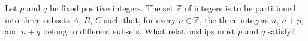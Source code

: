 Let $p$ and $q$ be fixed positive integers. The set $\mathbb{Z}$ of integers is to be partitioned into three subsets $A$, $B$, $C$ such that, for every $n \in \mathbb{Z}$, the three integers $n$, $n + p$, and $n + q$ belong to different subsets. What relationships must $p$ and $q$ satisfy?
